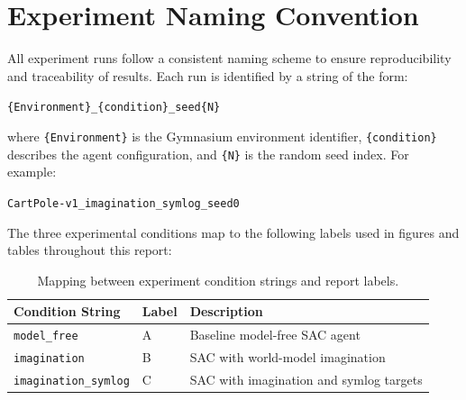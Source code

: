 \chapter{Experiment Naming Convention}
\label{appn:B}

All experiment runs follow a consistent naming scheme to ensure reproducibility and traceability of results. Each run is identified by a string of the form:

\begin{center}
\texttt{\{Environment\}\_\{condition\}\_seed\{N\}}
\end{center}

\noindent where \texttt{\{Environment\}} is the Gymnasium environment identifier, \texttt{\{condition\}} describes the agent configuration, and \texttt{\{N\}} is the random seed index. For example:

\begin{center}
\texttt{CartPole-v1\_imagination\_symlog\_seed0}
\end{center}

\noindent The three experimental conditions map to the following labels used in figures and tables throughout this report:

\begin{table}[htbp]
\centering
\caption{Mapping between experiment condition strings and report labels.}
\label{tab:naming_convention}
\begin{tabular}{@{}lll@{}}
\toprule
\textbf{Condition String} & \textbf{Label} & \textbf{Description} \\
\midrule
\texttt{model\_free}            & A & Baseline model-free SAC agent \\
\texttt{imagination}            & B & SAC with world-model imagination \\
\texttt{imagination\_symlog}    & C & SAC with imagination and symlog targets \\
\bottomrule
\end{tabular}
\end{table}